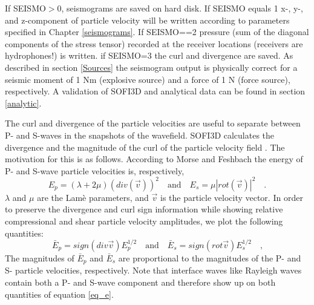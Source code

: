 \documentclass[11pt,onecolumn,oneside]{article}
\begin{document}
If SEISMO$>$0, seismograms are saved on hard disk. If SEISMO equals 1 x-, y-, and z-component of particle velocity will be written according to parameters specified in Chapter \ref{seismograms}.
If SEISMO==2 pressure (sum of the diagonal components of the stress tensor) recorded at the receiver locations (receivers are hydrophones!) is written. if SEISMO=3 the curl and divergence are saved. As described in section \ref{Sources} the seismogram output is physically correct for a seismic moment of 1 Nm (explosive source) and a force of 1 N (force source), respectively. A validation of SOFI3D and analytical data can be found in section \ref{analytic}.

The curl and divergence of the particle velocities are useful to separate between P- and S-waves in the snapshots of the wavefield. SOFI3D calculates the divergence and the magnitude of the curl of the particle velocity field \cite{dougherty:88}. The motivation for this is as follows. According to Morse and Feshbach  the energy of P- and S-wave particle velocities is, respectively,
\begin{equation}
E_p=\left(\lambda + 2 \mu\right) (div(\vec{v}))^2 \quad \mbox{and} \quad E_s=\mu \left|rot(\vec{v})\right|^2 \quad\mbox{.}
\label{eq_E}
\end{equation}
$\lambda$ and $\mu$ are the Lam\`{e} parameters, and $\vec{v}$ is the particle velocity vector. In order to preserve the divergence and curl sign information  while showing relative compressional
and shear particle velocity amplitudes, we plot the following quantities:
\begin{equation}
\bar{E}_p=sign(div \vec{v}) E_p^{1/2} \quad \mbox{and} \quad \bar{E}_s= sign(rot\vec{v}) E_s^{1/2} \quad\mbox{,}
\label{eq_e}
\end{equation}
The magnitudes of $\bar{E}_p$ and $\bar{E}_s$ are proportional to the magnitudes of the P- and S- particle velocities, respectively. Note that interface waves like Rayleigh waves contain both a P- and S-wave component and therefore show up on both quantities of equation \ref{eq_e}.
\end{document}
